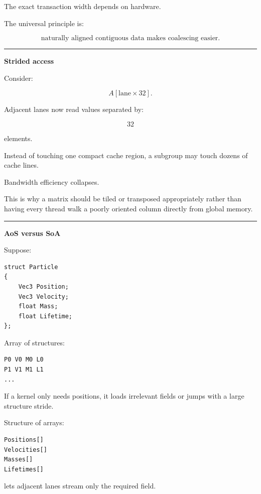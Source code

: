 The exact transaction width depends on hardware.

The universal principle is:

\[
\boxed{
\text{naturally aligned contiguous data makes coalescing easier}.
}
\]

\begin{center}\rule{0.5\linewidth}{0.5pt}\end{center}

\textbf{Strided access}

Consider:

\[
A[\text{lane}\times32].
\]

Adjacent lanes now read values separated by:

\[
32
\]

elements.

Instead of touching one compact cache region, a subgroup may touch dozens of cache lines.

Bandwidth efficiency collapses.

This is why a matrix should be tiled or transposed appropriately rather than having every thread walk a poorly oriented column directly from global memory.

\begin{center}\rule{0.5\linewidth}{0.5pt}\end{center}

\textbf{AoS versus SoA}

Suppose:

\protect{}\label{4azajn}%
\begin{verbatim}
struct Particle
{
    Vec3 Position;
    Vec3 Velocity;
    float Mass;
    float Lifetime;
};
\end{verbatim}

Array of structures:

\protect{}\label{9euomv}%
\begin{verbatim}
P0 V0 M0 L0
P1 V1 M1 L1
...
\end{verbatim}

If a kernel only needs positions, it loads irrelevant fields or jumps with a large structure stride.

Structure of arrays:

\protect{}\label{atbpdt}%
\begin{verbatim}
Positions[]
Velocities[]
Masses[]
Lifetimes[]
\end{verbatim}

lets adjacent lanes stream only the required field.


